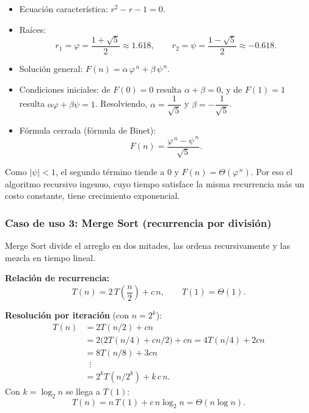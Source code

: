 \documentclass{article}
\begin{document}
        \begin{itemize}
        \item Ecuación característica: $r^2 - r - 1 = 0$.
        \item Raíces:
                \[
                r_1 = \varphi = \frac{1+\sqrt{5}}{2} \approx 1.618,
                \qquad
                r_2 = \psi = \frac{1-\sqrt{5}}{2} \approx -0.618.
                \]
        \item Solución general: $F(n) = \alpha\,\varphi^{\,n} + \beta\,\psi^{\,n}$.
        \item Condiciones iniciales: de $F(0) = 0$ resulta $\alpha + \beta = 0$, y de
                $F(1) = 1$ resulta $\alpha\varphi + \beta\psi = 1$. Resolviendo,
                $\alpha = \dfrac{1}{\sqrt{5}}$ y $\beta = -\dfrac{1}{\sqrt{5}}$.
        \item Fórmula cerrada (fórmula de Binet):
                \[
                F(n) = \frac{\varphi^{\,n} - \psi^{\,n}}{\sqrt{5}}.
                \]
        \end{itemize}
        
        Como $|\psi| < 1$, el segundo término tiende a $0$ y
        $F(n) = \Theta\!\left(\varphi^{\,n}\right)$. Por eso el algoritmo recursivo
        ingenuo, cuyo tiempo satisface la misma recurrencia más un costo constante,
        tiene crecimiento exponencial.
        
        \subsubsection{Caso de uso 3: Merge Sort (recurrencia por división)}
        
        Merge Sort divide el arreglo en dos mitades, las ordena recursivamente y las
        mezcla en tiempo lineal.
        
        \textbf{Relación de recurrencia:}
        \[
        T(n) = 2\,T\!\left(\frac{n}{2}\right) + c\,n, \qquad T(1) = \Theta(1).
        \]
        
        \textbf{Resolución por iteración} (con $n = 2^k$):
        \begin{align*}
        T(n) &= 2T(n/2) + cn \\
            &= 2\bigl(2T(n/4) + cn/2\bigr) + cn = 4T(n/4) + 2cn \\
            &= 8T(n/8) + 3cn \\
            &\;\;\vdots \\
            &= 2^k T(n/2^k) + k\,c\,n.
        \end{align*}
        Con $k = \log_2 n$ se llega a $T(1)$:
        \[
        T(n) = n\,T(1) + c\,n\log_2 n = \Theta(n\log n).
        \]
        
\end{document}
